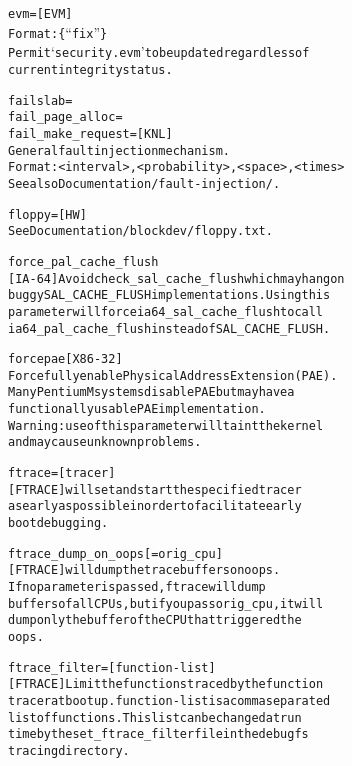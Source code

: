 \documentclass[a4paper,8pt,english]{sphinxmanual}
\begin{document}
\begin{alltt}
        evm=            {[}EVM{]}
                        Format: \{ ``fix'' \}
                        Permit `security.evm' to be updated regardless of
                        current integrity status.

        failslab=
        fail\_page\_alloc=
        fail\_make\_request={[}KNL{]}
                        General fault injection mechanism.
                        Format: \textless{}interval\textgreater{},\textless{}probability\textgreater{},\textless{}space\textgreater{},\textless{}times\textgreater{}
                        See also Documentation/fault-injection/.

        floppy=         {[}HW{]}
                        See Documentation/blockdev/floppy.txt.

        force\_pal\_cache\_flush
                        {[}IA-64{]} Avoid check\_sal\_cache\_flush which may hang on
                        buggy SAL\_CACHE\_FLUSH implementations. Using this
                        parameter will force ia64\_sal\_cache\_flush to call
                        ia64\_pal\_cache\_flush instead of SAL\_CACHE\_FLUSH.

        forcepae {[}X86-32{]}
                        Forcefully enable Physical Address Extension (PAE).
                        Many Pentium M systems disable PAE but may have a
                        functionally usable PAE implementation.
                        Warning: use of this parameter will taint the kernel
                        and may cause unknown problems.

        ftrace={[}tracer{]}
                        {[}FTRACE{]} will set and start the specified tracer
                        as early as possible in order to facilitate early
                        boot debugging.

        ftrace\_dump\_on\_oops{[}=orig\_cpu{]}
                        {[}FTRACE{]} will dump the trace buffers on oops.
                        If no parameter is passed, ftrace will dump
                        buffers of all CPUs, but if you pass orig\_cpu, it will
                        dump only the buffer of the CPU that triggered the
                        oops.

        ftrace\_filter={[}function-list{]}
                        {[}FTRACE{]} Limit the functions traced by the function
                        tracer at boot up. function-list is a comma separated
                        list of functions. This list can be changed at run
                        time by the set\_ftrace\_filter file in the debugfs
                        tracing directory.


\end{alltt}
\end{document}
